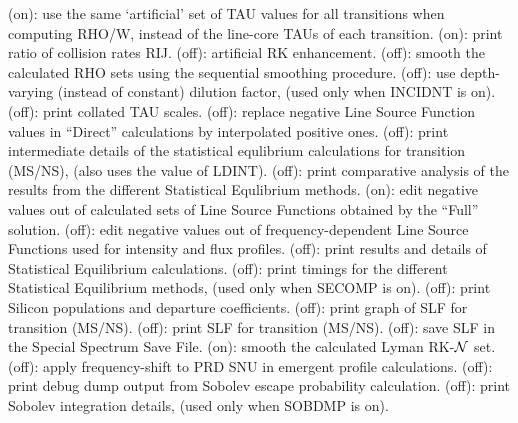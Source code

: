 \space \vbox { (on): \bang
use the same `artificial' set of TAU values for all transitions when
computing RHO/W, instead of the line-core TAUs of each transition.}
\space \vbox { (on): \bang
print ratio of collision rates RIJ.}
\space \vbox { (off): \bang
artificial RK enhancement.}
\space \vbox { (off): \bang
smooth the calculated RHO sets using the sequential smoothing procedure.}
\space \vbox { (off): \bang
use depth-varying (instead of constant) dilution factor, (used only when
INCIDNT is on).}
\space \vbox { (off): \bang
print collated TAU scales.}
\space \vbox { (off): \bang
replace negative Line Source Function values in ``Direct'' calculations
by interpolated positive ones.}
\space \vbox { (off): \bang
print intermediate details of the statistical equlibrium calculations
for transition (MS/NS), (also uses the value of LDINT).}
\space \vbox { (off): \bang
print comparative analysis of the results from the different Statistical
Equlibrium methods.}
\space \vbox { (on): \bang
edit negative values out of calculated sets of Line Source Functions
obtained by the ``Full'' solution.}
\space \vbox { (off): \bang
edit negative values out of frequency-dependent Line Source Functions
used for intensity and flux profiles.}
\space \vbox { (off): \bang
print results and details of Statistical Equilibrium calculations.}
\space \vbox { (off): \bang
print timings for the different Statistical Equilibrium methods, (used only
when SECOMP is on).}
\space \vbox { (off): \bang
print Silicon populations and departure coefficients.}
\space \vbox { (off): \bang
print graph of SLF for transition (MS/NS).}
\space \vbox { (off): \bang
print SLF for transition (MS/NS).}
\space \vbox { (off): \bang
save SLF in the Special Spectrum Save File.}
\space \vbox { (on): \bang
smooth the calculated Lyman RK-${\cal N}$ set.}
\space \vbox { (off): \bang
apply frequency-shift to PRD SNU in emergent profile calculations.}
\space \vbox { (off): \bang
print debug dump output from Sobolev escape probability calculation.}
\space \vbox { (off): \bang
print Sobolev integration details, (used only when SOBDMP is on).}
